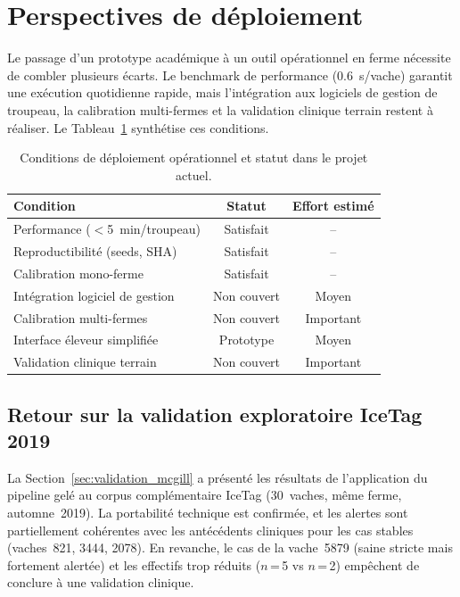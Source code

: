\FloatBarrier
\section{Perspectives de déploiement}

Le passage d'un prototype académique à un outil opérationnel en ferme nécessite de combler
plusieurs écarts. Le benchmark de performance (0.6~s/vache) garantit une exécution
quotidienne rapide, mais l'intégration aux logiciels de gestion de troupeau, la calibration
multi-fermes et la validation clinique terrain restent à réaliser. Le
Tableau~\ref{tab:conditions_deploiement} synthétise ces conditions.

\begin{table}[H]
    \centering
    \caption{Conditions de déploiement opérationnel et statut dans le projet actuel.}
    \label{tab:conditions_deploiement}
    \begin{tabular}{lcc}
        \toprule
        \textbf{Condition} & \textbf{Statut} & \textbf{Effort estimé} \\
        \midrule
        Performance ($<$5~min/troupeau) & Satisfait & -- \\
        Reproductibilité (seeds, SHA) & Satisfait & -- \\
        Calibration mono-ferme & Satisfait & -- \\
        Intégration logiciel de gestion & Non couvert & Moyen \\
        Calibration multi-fermes & Non couvert & Important \\
        Interface éleveur simplifiée & Prototype & Moyen \\
        Validation clinique terrain & Non couvert & Important \\
        \bottomrule
    \end{tabular}
\end{table}

\subsection{Retour sur la validation exploratoire IceTag 2019}

La Section~\ref{sec:validation_mcgill} a présenté les résultats de l'application du
pipeline gelé au corpus complémentaire IceTag (30~vaches, même ferme, automne~2019).
La portabilité technique est confirmée, et les alertes sont partiellement cohérentes
avec les antécédents cliniques pour les cas stables (vaches~821, 3444, 2078). En
revanche, le cas de la vache~5879 (saine stricte mais fortement alertée) et les
effectifs trop réduits ($n$\,=\,5 vs $n$\,=\,2) empêchent de conclure à une
validation clinique.

